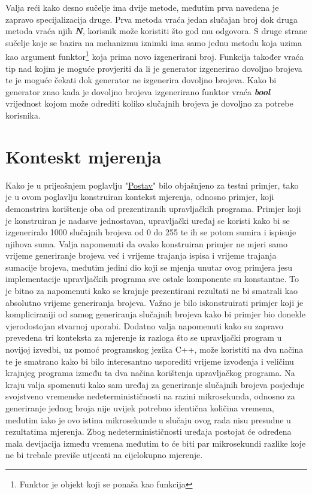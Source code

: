 Valja reći kako desno sučelje ima dvije metode, međutim prva navedena je zapravo specijalizacija druge. Prva metoda vraća jedan slučajan broj dok druga metoda vraća njih \textbf{\textit{N}}, korisnik može koristiti što god mu odgovora. S druge strane sučelje koje se bazira na mehanizmu iznimki ima samo jednu metodu koja uzima kao argument funktor\footnote{Funktor je objekt koji se ponaša kao funkcija} koja prima novo izgenerirani broj. Funkcija također vraća tip nad kojim je moguće provjeriti da li je generator izgenerirao dovoljno brojeva te je moguće čekati dok generator ne izgenerira dovoljno brojeva. Kako bi generator znao kada je dovoljno brojeva izgenerirano funktor vraća \textbf{\textit{bool}} vrijednost kojom može odrediti koliko slučajnih brojeva je dovoljno za potrebe korisnika.

\section{Konteskt mjerenja}
Kako je u prijeašnjem poglavlju "\hyperref[section:setup]{Postav}" bilo objašnjeno za testni primjer, tako je u ovom poglavlju konstruiran kontekst mjerenja, odnosno primjer, koji demonstrira korištenje oba od prezentiranih upravljačkih programa. Primjer koji je konstruiran je nadasve jednostavan, upravljački uređaj se koristi kako bi se izgeneriralo 1000 slučajnih brojeva od 0 do 255 te ih se potom sumira i ispisuje njihova suma. Valja napomenuti da ovako konstruiran primjer ne mjeri samo vrijeme generiranje brojeva već i vrijeme trajanja ispisa i vrijeme trajanja sumacije brojeva, međutim jedini dio koji se mjenja unutar ovog primjera jesu implementacije upravljačkih programa sve ostale komponente su konstantne. To je bitno za napomenuti kako se krajnje prezentirani rezultati ne bi smatrali kao absolutno vrijeme generiranja brojeva. Važno je bilo iskonstruirati primjer koji je kompliciraniji od samog generiranja slučajnih brojeva kako bi primjer bio donekle vjerodostojan stvarnoj uporabi. Dodatno valja napomenuti kako su zapravo prevedena tri konteksta za mjerenje iz razloga što se upravljački program u novijoj izvedbi, uz pomoć programskog jezika C++, može koristiti na dva načina te je smatrano kako bi bilo interesantno usporediti vrijeme izvođenja i veličinu krajnjeg programa između ta dva načina korištenja upravljačkog programa. Na kraju valja spomenuti kako sam uređaj za generiranje slučajnih brojeva posjeduje svojstveno vremenske nedeterminističnosti na razini mikrosekunda, odnosno za generiranje jednog broja nije uvijek potrebno identična količina vremena, međutim iako je ovo istina mikrosekunde u slučaju ovog rada nisu presudne u rezultatima mjerenja. Zbog nedeterminističnosti uređaja postojat će određena mala devijacija između vremena međutim to će biti par mikrosekundi razlike koje ne bi trebale previše utjecati na cijelokupno mjerenje.
